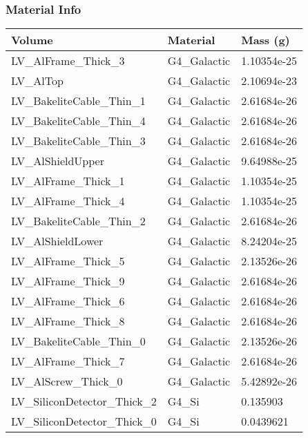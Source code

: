\documentclass[8pt]{beamer}
\begin{document}
            \begin{frame}
                \frametitle{Material Info}
            
            \begin{table}
            \begin{tabular}{lll}
             Volume & Material & Mass (g) \\
                    
            \midrule
            LV\_AlFrame\_Thick\_3 & G4\_Galactic & 1.10354e-25\\
                        LV\_AlTop & G4\_Galactic & 2.10694e-23\\
                        LV\_BakeliteCable\_Thin\_1 & G4\_Galactic & 2.61684e-26\\
                        LV\_BakeliteCable\_Thin\_4 & G4\_Galactic & 2.61684e-26\\
                        LV\_BakeliteCable\_Thin\_3 & G4\_Galactic & 2.61684e-26\\
                        LV\_AlShieldUpper & G4\_Galactic & 9.64988e-25\\
                        LV\_AlFrame\_Thick\_1 & G4\_Galactic & 1.10354e-25\\
                        LV\_AlFrame\_Thick\_4 & G4\_Galactic & 1.10354e-25\\
                        LV\_BakeliteCable\_Thin\_2 & G4\_Galactic & 2.61684e-26\\
                        LV\_AlShieldLower & G4\_Galactic & 8.24204e-25\\
                        LV\_AlFrame\_Thick\_5 & G4\_Galactic & 2.13526e-26\\
                        LV\_AlFrame\_Thick\_9 & G4\_Galactic & 2.61684e-26\\
                        LV\_AlFrame\_Thick\_6 & G4\_Galactic & 2.61684e-26\\
                        LV\_AlFrame\_Thick\_8 & G4\_Galactic & 2.61684e-26\\
                        LV\_BakeliteCable\_Thin\_0 & G4\_Galactic & 2.13526e-26\\
                        LV\_AlFrame\_Thick\_7 & G4\_Galactic & 2.61684e-26\\
                        LV\_AlScrew\_Thick\_0 & G4\_Galactic & 5.42892e-26\\
                        LV\_SiliconDetector\_Thick\_2 & G4\_Si & 0.135903\\
                        LV\_SiliconDetector\_Thick\_0 & G4\_Si & 0.0439621\\

\end{tabular}
\end{table}
\end{frame}
\end{document}
